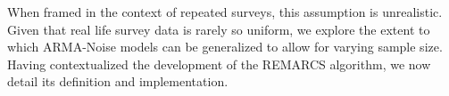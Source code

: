 When framed in the context of repeated surveys, this assumption is unrealistic. 
Given that real life survey data is rarely so uniform, we explore the extent to which 
ARMA-Noise models can be generalized to allow for varying sample size. Having contextualized the development of the REMARCS algorithm, we now detail its definition and implementation.


